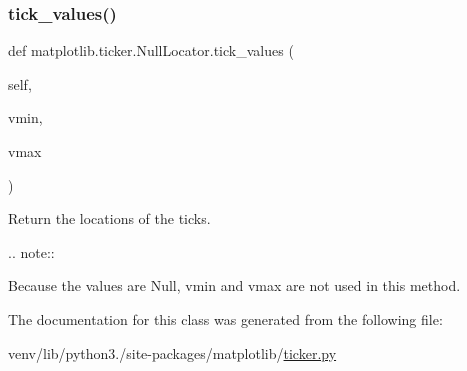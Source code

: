 \subsubsection{\texorpdfstring{tick\+\_\+values()}{tick\_values()}}
{\footnotesize\ttfamily def matplotlib.\+ticker.\+Null\+Locator.\+tick\+\_\+values (\begin{DoxyParamCaption}\item[{}]{self,  }\item[{}]{vmin,  }\item[{}]{vmax }\end{DoxyParamCaption})}

\begin{DoxyVerb}Return the locations of the ticks.

.. note::

    Because the values are Null, vmin and vmax are not used in this
    method.
\end{DoxyVerb}
 

The documentation for this class was generated from the following file\+:\begin{DoxyCompactItemize}
\item 
venv/lib/python3./site-\/packages/matplotlib/\hyperlink{ticker_8py}{ticker.\+py}\end{DoxyCompactItemize}
